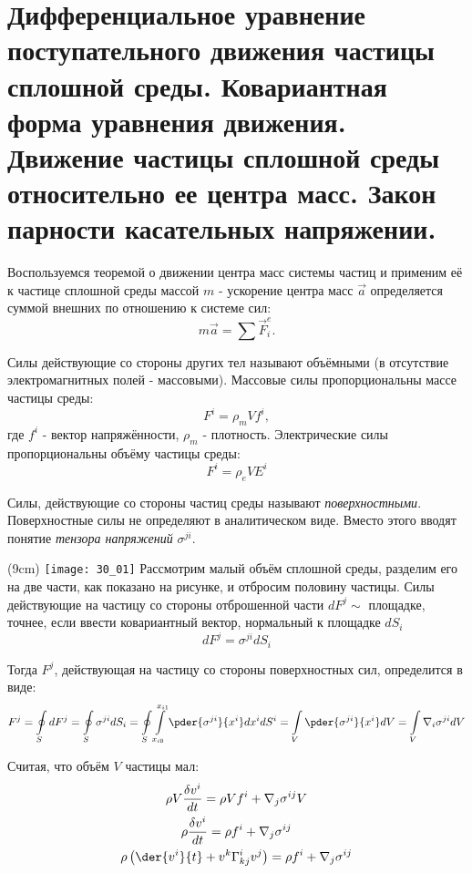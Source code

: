 \chapter{Дифференциальное уравнение поступательного движения частицы сплошной
среды. Ковариантная форма уравнения движения. Движение частицы сплошной
среды относительно ее центра масс. Закон парности касательных напряжении.}

Воспользуемся теоремой о движении центра масс системы частиц и применим её к частице сплошной среды массой \( m \) - ускорение центра масс \( \vec{a} \) определяется суммой внешних по отношению к системе сил:
\[
    m\vec{a} = \sum \vec{F}_i^e.
\]

Силы действующие со стороны других тел называют объёмными (в отсутствие
электромагнитных полей - массовыми). Массовые силы пропорциональны массе
частицы среды:
\[
    F^i = \rho_m V f^i,
\]
где \( f^i \) - вектор напряжённости, \( \rho_m  \) - плотность. Электрические силы пропорциональны объёму частицы среды:
\[
    F^i = \rho_e V E^i
\]

Силы, действующие со стороны частиц среды называют \emph{поверхностными}. Поверхностные силы не определяют в аналитическом виде. Вместо этого вводят
понятие \emph{тензора напряжений} \( \sigma^{ji} \).

\sidefig(9cm)
{\texttt{[image: 30\_01]}}{
Рассмотрим малый объём сплошной среды, разделим его на две части, как показано
на рисунке, и отбросим половину частицы. Силы действующие на частицу со стороны
отброшенной части \( dF^j \sim  \) площадке, точнее, если ввести ковариантный
вектор, нормальный к площадке \( dS_i \) 
\[
    dF^j = \sigma^{ji} dS_i
\]
}

Тогда \( F^j \), действующая на частицу со стороны поверхностных сил,
определится в виде:
\[
    F^j = 
    \oint\limits_S dF^j = 
    \oint\limits_S \sigma^{ji} dS_i =
    \oint\limits_S \int\limits_{x_{i0}}^{x_{i1}} \pder{\sigma^{ji}}{x^i} dx^i
    dS^i =
    \int\limits_V \pder{\sigma^{ji}}{x^i} dV =
    \int\limits_V \nabla_i \sigma^{ji} dV
\]
    
Считая, что объём \( V \) частицы мал:
\begin{gather*}
    \rho V \frac{\delta v^i}{dt} = \rho V f^i + \nabla_j \sigma^{ij} V\\
    \rho \frac{\delta v^i}{dt} = \rho f^i + \nabla_j \sigma^{ij} \\
    \rho \left( \der{v^i}{t} + v^k \Gamma^i_{kj} v^j\right) = \rho f^i +
    \nabla_j \sigma^{ij} 
\end{gather*}


